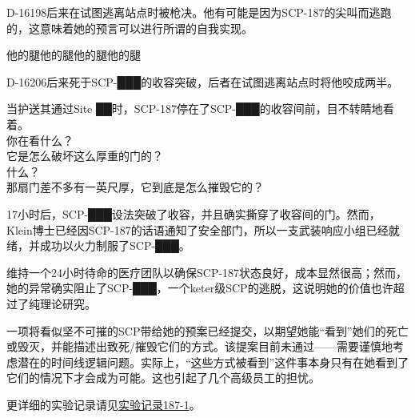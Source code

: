 D-16198后来在试图逃离站点时被枪决。他有可能是因为SCP-187的尖叫而逃跑的，这意味着她的预言可以进行所谓的自我实现。


\begin{scpbox}

他的腿他的腿他的腿他的腿

\end{scpbox}

D-16206后来死于SCP-███的收容突破，后者在试图逃离站点时将他咬成两半。

\hr


\begin{scpbox}

当护送其通过Site ██时，SCP-187停在了SCP-███的收容间前，目不转睛地看着。\\
你在看什么？\\
它是怎么破坏这么厚重的门的？\\
什么？\\
那扇门差不多有一英尺厚，它到底是怎么摧毁它的？

\end{scpbox}

17小时后，SCP-███设法突破了收容，并且确实撕穿了收容间的门。然而， Klein博士已经因SCP-187的话语通知了安全部门，所以一支武装响应小组已经就绪，并成功以火力制服了SCP-███。

维持一个24小时待命的医疗团队以确保SCP-187状态良好，成本显然很高；然而，她的异常确实阻止了SCP-███，一个keter级SCP的逃脱，这说明她的价值也许超过了纯理论研究。

一项将看似坚不可摧的SCP带给她的预案已经提交，以期望她能“看到”她们的死亡或毁灭，并能描述出致死\slash 摧毁它们的方式。该提案目前未通过——需要谨慎地考虑潜在的时间线逻辑问题。实际上，“这些方式被看到”这件事本身只有在她看到了它们的情况下才会成为可能。这也引起了几个高级员工的担忧。

更详细的实验记录请见\hyperref[sec:DOC-experiment-log-187-1]{实验记录187-1}。

\newpage

